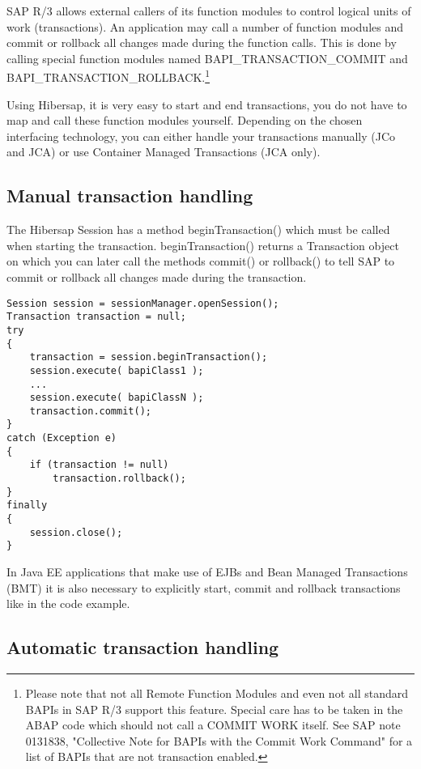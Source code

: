 SAP R/3 allows external callers of its function modules to control logical units of work (transactions). 
An application may call a number of function modules and commit or rollback all changes made during
the function calls. This is done by calling special function modules named BAPI\_TRANSACTION\_COMMIT and 
BAPI\_TRANSACTION\_ROLLBACK.\footnote{Please note that not all Remote Function Modules and even not 
all standard BAPIs in SAP R/3 support this feature. Special care has to be taken in the ABAP code which should not
call a COMMIT WORK itself. See SAP note 0131838, "Collective Note for BAPIs with the Commit Work Command"
for a list of BAPIs that are not transaction enabled.}

Using Hibersap, it is very easy to start and end transactions, you do not have to map and call these function modules yourself. Depending on the chosen interfacing technology, you can either handle your transactions manually (JCo and JCA) or use Container Managed Transactions (JCA only).

\subsection{Manual transaction handling}

The Hibersap Session has a method beginTransaction() which must be called when starting the transaction. beginTransaction() returns a Transaction object on which you can later call the methods commit() or rollback() to tell SAP to commit or rollback all changes made during the transaction.

\begin{lstlisting}[caption=Manual transaction handling]
Session session = sessionManager.openSession();
Transaction transaction = null;
try
{
    transaction = session.beginTransaction();
    session.execute( bapiClass1 );
    ...
    session.execute( bapiClassN );
    transaction.commit();
}
catch (Exception e)
{
    if (transaction != null)
        transaction.rollback();
}
finally
{
    session.close();
}
\end{lstlisting}

In Java EE applications that make use of EJBs and Bean Managed Transactions (BMT) it is also necessary to explicitly start, commit and rollback transactions like in the code example.

\subsection{Automatic transaction handling}

